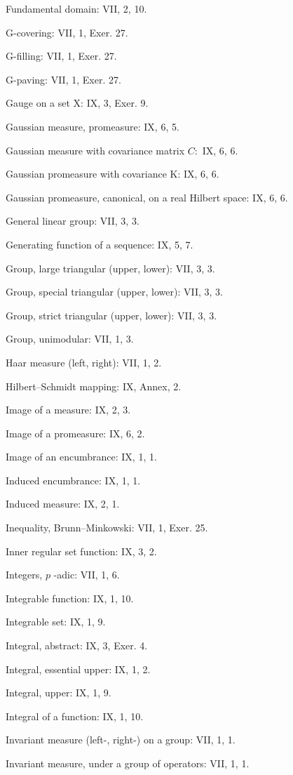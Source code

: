 Fundamental domain: VII, 2, 10.

G-covering: VII, 1, Exer. 27.

G-filling: VII, 1, Exer. 27.

G-paving: VII, 1, Exer. 27.

Gauge on a set X: IX, 3, Exer. 9.

Gaussian measure, promeasure: IX, 6, 5.

Gaussian measure with covariance matrix \(C:\) IX, 6, 6.

Gaussian promeasure with covariance K: IX, 6, 6.

Gaussian promeasure, canonical, on a real Hilbert space: IX, 6, 6.

General linear group: VII, 3, 3.

Generating function of a sequence: IX, 5, 7.

Group, large triangular (upper, lower): VII, 3, 3.

Group, special triangular (upper, lower): VII, 3, 3.

Group, strict triangular (upper, lower): VII, 3, 3.

Group, unimodular: VII, 1, 3.

Haar measure (left, right): VII, 1, 2.

Hilbert--Schmidt mapping: IX, Annex, 2.

Image of a measure: IX, 2, 3.

Image of a promeasure: IX, 6, 2.

Image of an encumbrance: IX, 1, 1.

Induced encumbrance: IX, 1, 1.

Induced measure: IX, 2, 1.

Inequality, Brunn--Minkowski: VII, 1, Exer. 25.

Inner regular set function: IX, 3, 2.

Integers, \(p\) -adic: VII, 1, 6.

Integrable function: IX, 1, 10.

Integrable set: IX, 1, 9.

Integral, abstract: IX, 3, Exer. 4.

Integral, essential upper: IX, 1, 2.

Integral, upper: IX, 1, 9.

Integral of a function: IX, 1, 10.

Invariant measure (left-, right-) on a group: VII, 1, 1.

Invariant measure, under a group of operators: VII, 1, 1.

